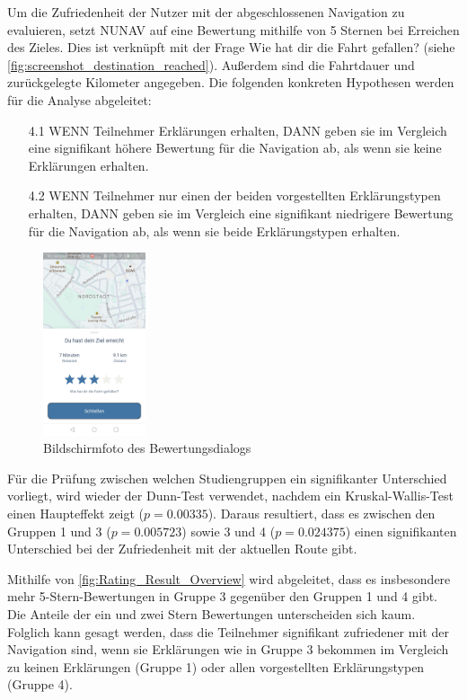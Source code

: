 Um die Zufriedenheit der Nutzer mit der abgeschlossenen Navigation zu evaluieren, setzt NUNAV auf eine Bewertung mithilfe von 5 Sternen bei Erreichen des Zieles. Dies ist verknüpft mit der Frage \glqq Wie hat dir die Fahrt gefallen?\grqq{} (siehe \autoref{fig:screenshot_destination_reached}). Außerdem sind die Fahrtdauer und zurückgelegte Kilometer angegeben. Die folgenden konkreten Hypothesen werden für die Analyse abgeleitet:

\begin{enumerate}
    \item[4.1] WENN Teilnehmer Erklärungen erhalten, DANN geben sie im Vergleich eine signifikant höhere Bewertung für die Navigation ab, als wenn sie keine Erklärungen erhalten.
    \item[4.2] WENN Teilnehmer nur einen der beiden vorgestellten Erklärungstypen erhalten, DANN geben sie im Vergleich eine signifikant niedrigere Bewertung für die Navigation ab, als wenn sie beide Erklärungstypen erhalten.
\end{enumerate}

\begin{figure}[htb!]
    \centering
    \includegraphics[width=0.27\textwidth]{contents/06_model_evaluation/02_evaluation/res/rating_screenshot.jpg}
    \caption{Bildschirmfoto des Bewertungsdialogs}
    \label{fig:screenshot_destination_reached}
\end{figure}


Für die Prüfung zwischen welchen Studiengruppen ein signifikanter Unterschied vorliegt, wird wieder der Dunn-Test \cite{dunn1964multiple} verwendet, nachdem ein Kruskal-Wallis-Test einen Haupteffekt zeigt ($ p = 0.00335 $). Daraus resultiert, dass es zwischen den Gruppen 1 und 3 ($ p = 0.005723$) sowie 3 und 4 ($ p = 0.024375 $) einen signifikanten Unterschied bei der Zufriedenheit mit der aktuellen Route gibt.

Mithilfe von \autoref{fig:Rating_Result_Overview} wird abgeleitet, dass es insbesondere mehr 5-Stern-Bewertungen in Gruppe 3 gegenüber den Gruppen 1 und 4 gibt. Die Anteile der ein und zwei Stern Bewertungen unterscheiden sich kaum. Folglich kann gesagt werden, dass die Teilnehmer signifikant zufriedener mit der Navigation sind, wenn sie Erklärungen wie in Gruppe 3 bekommen im Vergleich zu keinen Erklärungen (Gruppe 1) oder allen vorgestellten Erklärungstypen (Gruppe 4).

